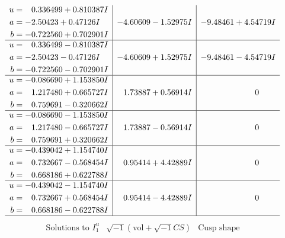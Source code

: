 \documentclass[1p]{elsarticle_modified}
\theoremstyle{definition}
\newcommand{\I}{\sqrt{-1}}
\begin{document}
$$\begin{array}{c|c|c}
\begin{aligned}
u &= \phantom{-}0.336499 + 0.810387 I \\
a &= -2.50423 + 0.47126 I \\
b &= -0.722560 + 0.702901 I\end{aligned}
 & -4.60609 - 1.52975 I & -9.48461 + 4.54719 I \\ \hline\begin{aligned}
u &= \phantom{-}0.336499 - 0.810387 I \\
a &= -2.50423 - 0.47126 I \\
b &= -0.722560 - 0.702901 I\end{aligned}
 & -4.60609 + 1.52975 I & -9.48461 - 4.54719 I \\ \hline\begin{aligned}
u &= -0.086690 + 1.153850 I \\
a &= \phantom{-}1.217480 + 0.665727 I \\
b &= \phantom{-}0.759691 - 0.320662 I\end{aligned}
 & \phantom{-}1.73887 + 0.56914 I & \phantom{-0.000000 } 0 \\ \hline\begin{aligned}
u &= -0.086690 - 1.153850 I \\
a &= \phantom{-}1.217480 - 0.665727 I \\
b &= \phantom{-}0.759691 + 0.320662 I\end{aligned}
 & \phantom{-}1.73887 - 0.56914 I & \phantom{-0.000000 } 0 \\ \hline\begin{aligned}
u &= -0.439042 + 1.154740 I \\
a &= \phantom{-}0.732667 - 0.568454 I \\
b &= \phantom{-}0.668186 + 0.622788 I\end{aligned}
 & \phantom{-}0.95414 + 4.42889 I & \phantom{-0.000000 } 0 \\ \hline\begin{aligned}
u &= -0.439042 - 1.154740 I \\
a &= \phantom{-}0.732667 + 0.568454 I \\
b &= \phantom{-}0.668186 - 0.622788 I\end{aligned}
 & \phantom{-}0.95414 - 4.42889 I & \phantom{-0.000000 } 0\\
 \hline 
 \end{array}$$\newpage$$\begin{array}{c|c|c}  
\text{Solutions to }I^u_{1}& \I (\text{vol} + \sqrt{-1}CS) & \text{Cusp shape}\\
 \hline 
\begin{aligned}

\end{aligned}
\end{array}$$
\end{document}
